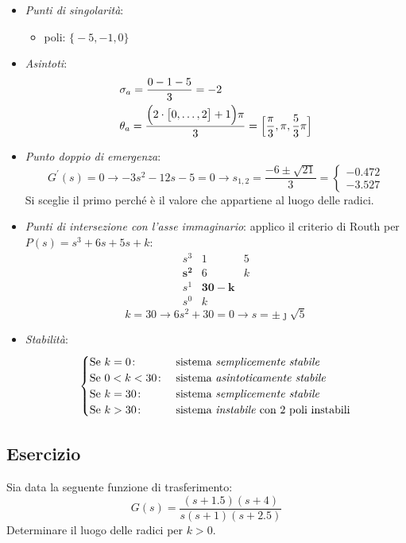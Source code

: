 \begin{itemize}
	\item \emph{Punti di singolarità}:
		\begin{itemize}
			\item poli: \(\bigl\{ -5, -1, 0 \bigr\}\)
		\end{itemize}
	\item \emph{Asintoti}:
		\begin{align*}
			& \sigma_a = \frac{0-1-5}{3} = -2 \\
			& \theta_a = \frac{\Bigl( 2 \cdot \bigl[ 0, \dots, 2 \bigr] +1 \Bigr) \pi}{3} = \Bigl[ \frac{\pi}{3}, \pi, \frac{5}{3}\pi \Bigr]
		\end{align*}
	\item \emph{Punto doppio di emergenza}:
		\[
			G^\prime (s) = 0 \rightarrow -3s^2 -12s -5=0 \rightarrow s_{1,2} = \frac{-6\pm\sqrt{21}}{3} = \begin{cases} \bm{-0.472} \\ -3.527 \end{cases}
		\]
		Si sceglie il primo perché è il valore che appartiene al luogo delle radici.
	\item \emph{Punti di intersezione con l'asse immaginario}:
		applico il criterio di Routh per \(P(s) = s^3 +6s +5s +k\):
		\[\begin{array}{r|rr}
			s^3      & 1 & 5 \\
			\bm{s^2} & 6 & k \\
			s^1      & \bm{30-k} \\
			s^0      & k
		\end{array}\]
		\[
			k = 30 \rightarrow 6s^2+30 = 0 \rightarrow s = \pm \jmath \sqrt{5}
		\]
	\item \emph{Stabilità}:
		\[\begin{cases}
			\text{Se } k = 0\colon & \text{sistema \emph{semplicemente stabile}} \\
			\text{Se } 0 < k < 30\colon & \text{sistema \emph{asintoticamente stabile}} \\
			\text{Se } k = 30\colon & \text{sistema \emph{semplicemente stabile}} \\
			\text{Se } k > 30\colon & \text{sistema \emph{instabile} con 2 poli instabili}
		\end{cases}\]
\end{itemize}


\subsection{Esercizio}
Sia data la seguente funzione di trasferimento:
\[
	G(s) = \frac{(s+1.5)(s+4)}{s(s+1)(s+2.5)}
\]
Determinare il luogo delle radici per \(k>0\).


